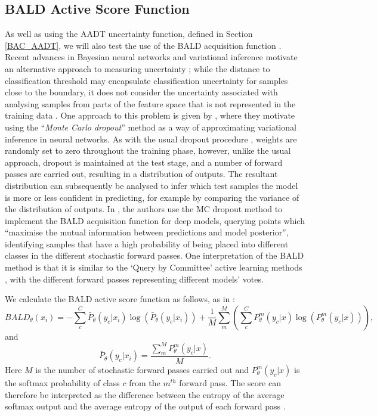 \subsection{BALD Active Score Function}\label{BALD}
As well as using the AADT uncertainty function, defined in Section \ref{BAC_AADT}, we will also test the use of the BALD acquisition function\cite{houlsby2011bayesian} \cite{gal2017deep}. Recent advances in Bayesian neural networks and variational inference motivate an alternative approach to measuring uncertainty \cite{gal2016uncertainty}; while the distance to classification threshold may encapsulate classification uncertainty for samples close to the boundary, it does not consider the uncertainty associated with analysing samples from parts of the feature space that is not represented in the training data \cite{gal2016uncertainty}. One approach to this problem is given by \cite{gal2016dropout}, where they motivate using the ``\textit{Monte Carlo dropout}'' method as a way of approximating variational inference in neural networks. As with the usual dropout procedure \cite{srivastava2014dropout}, weights are randomly set to zero throughout the training phase, however, unlike the usual approach, dropout is maintained at the test stage, and a number of forward passes are carried out, resulting in a distribution of outputs. The resultant distribution can subsequently be analysed to infer which test samples the model is more or less confident in predicting, for example by comparing the variance of the distribution of outputs. In \cite{gal2017deep}, the authors use the MC dropout method to implement the BALD acquisition function for deep models, querying points which ``maximise the mutual information between predictions and model posterior'', identifying samples that have a high probability of being placed into different classes in the different stochastic forward passes. One interpretation of the BALD method is that it is similar to the `Query by Committee' active learning methods \cite{settles2012active}, with the different forward passes representing different models' votes. 

We calculate the BALD active score function as follows, as in \cite{gal2017deep}:
\begin{equation}
BALD_{\theta}(x_i) = - \sum_{c}^{C} \bar{P}_{\theta}(y_c|x_i)\log( \bar{P}_{\theta}(y_c|x_i)) + \frac{1}{M} \sum_{m}^{M} (\sum_{c}^{C} P^{m}_{\theta}(y_c|x)\log(P^{m}_{\theta}(y_c|x))),
\end{equation}
and
\begin{equation}
 \bar{P}_{\theta}(y_c|x_i) = \frac{\sum_{m}^{M}P^{m}_{\theta}(y_c|x)}{M}. 
\end{equation}
Here $M$ is the number of stochastic forward passes carried out and $P^{m}_{\theta}(y_c|x)$ is the softmax probability of class $c$ from the $m^{th}$ forward pass. The score can therefore be interpreted as the difference between the entropy of the average softmax output and the average entropy of the output of each forward pass \cite{gal2017deep}.
 
